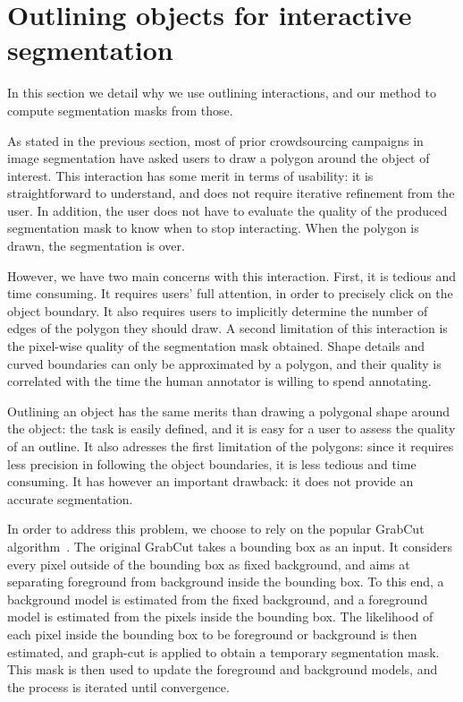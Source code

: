 \section{Outlining objects for interactive segmentation}%
\label{sec:method}


In this section we detail why we use outlining interactions,
and our method to compute segmentation masks from those.


As stated in the previous section, most of prior crowdsourcing
campaigns in image segmentation have asked users to draw
a polygon around the object of interest.
This interaction has some merit in terms of usability:
it is straightforward to understand,
and does not require iterative refinement from the user.
In addition, the user does not have to evaluate the quality
of the produced segmentation mask to know when to stop interacting.
When the polygon is drawn, the segmentation is over.


However, we have two main concerns with this interaction.
First, it is tedious and time consuming. It requires users' full
attention, in order to precisely click on the object boundary.
It also requires users to implicitly determine the number
of edges of the polygon they should draw.
A second limitation of this interaction is the pixel-wise quality
of the segmentation mask obtained.
Shape details and curved boundaries can only be approximated by a polygon,
and their quality is correlated with the time
the human annotator is willing to spend annotating.


Outlining an object has the same merits than drawing a polygonal shape
around the object: the task is easily defined,
and it is easy for a user to assess the quality of an outline.
It also adresses the first limitation of the polygons:
since it requires less precision in following the object boundaries,
it is less tedious and time consuming.
It has however an important drawback:
it does not provide an accurate segmentation.


In order to address this problem, we choose to rely on the popular
GrabCut algorithm~\cite{rother_grabcut:_2004}.
The original GrabCut takes a bounding box as an input.
It considers every pixel outside of the bounding box as fixed background,
and aims at separating foreground from background inside the bounding box.
To this end, a background model is estimated from the fixed background,
and a foreground model is estimated from the pixels
inside the bounding box.
The likelihood of each pixel inside the bounding box
to be foreground or background is then estimated,
and graph-cut is applied to obtain a temporary segmentation mask.
This mask is then used to update the foreground and background models,
and the process is iterated until convergence.


